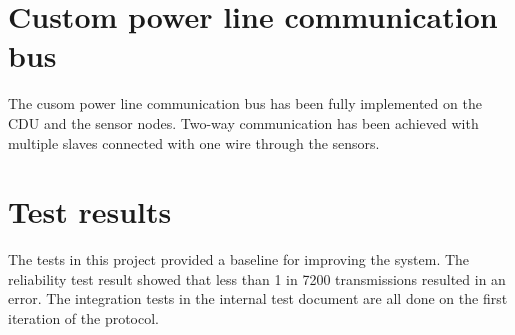 \section{Custom power line communication bus}
The cusom power line communication bus has been fully implemented on the CDU and the sensor nodes. Two-way communication has been achieved with multiple slaves connected with one wire through the sensors.

\section{Test results}
The tests in this project provided a baseline for improving the system. The reliability test result showed that less than 1 in 7200 transmissions resulted in an error. The integration tests in the internal test document are all done on the first iteration of the protocol. 



